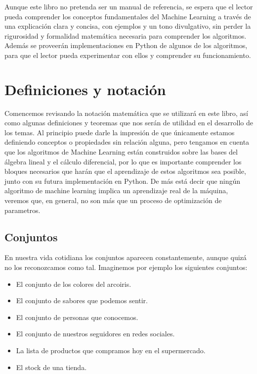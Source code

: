 Aunque este libro no pretenda ser un manual de referencia, se espera que el lector pueda comprender los conceptos fundamentales del Machine Learning a través de una 
explicación clara y concisa, con ejemplos y un tono divulgativo, sin perder la rigurosidad y formalidad matemática necesaria para comprender los algoritmos. Además 
se proveerán implementaciones en Python de algunos de los algoritmos, para que el lector pueda experimentar con ellos y comprender su funcionamiento.

\section{Definiciones y notación}

Comencemos revisando la notación matemática que se utilizará en este libro, así como algunas definiciones y teoremas que nos serán de utilidad en el desarrollo de los temas.
Al principio puede darle la impresión de que únicamente estamos definiendo conceptos o propiedades sin relación alguna, pero tengamos en cuenta 
que los algoritmos de Machine Learning están construidos sobre las bases del álgebra lineal y el cálculo diferencial, por lo que es importante
comprender los bloques necesarios que harán que el aprendizaje de estos algoritmos sea posible, junto con su futura implementación en Python.
De más está decir que ningún algoritmo de machine learning implica un aprendizaje real de la máquina, veremos que, en general, no son más que un proceso de optimización de parametros.

\subsection{Conjuntos}

En nuestra vida cotidiana los conjuntos aparecen constantemente, aunque quizá no los reconozcamos como tal. Imaginemos por ejemplo los siguientes conjuntos:

\begin{itemize}
    \item El conjunto de los colores del arcoiris.
    \item El conjunto de sabores que podemos sentir.
    \item El conjunto de personas que conocemos.
    \item El conjunto de nuestros seguidores en redes sociales.
    \item La lista de productos que compramos hoy en el supermercado.
    \item El stock de una tienda.
\end{itemize}

